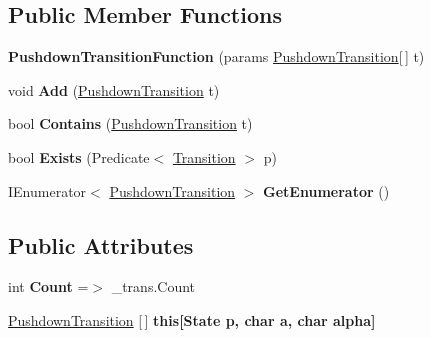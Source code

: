 \subsection*{Public Member Functions}
\begin{DoxyCompactItemize}
\item 
\mbox{\label{class_system_1_1_automata_1_1_pushdown_transition_function_a2f4c35d7442e155bf73aaa70c3bb203e}} 
{\bfseries Pushdown\+Transition\+Function} (params \mbox{\hyperlink{class_system_1_1_automata_1_1_pushdown_transition}{Pushdown\+Transition}}\mbox{[}$\,$\mbox{]} t)
\item 
\mbox{\label{class_system_1_1_automata_1_1_pushdown_transition_function_a2f391f47af647521368f76797263e999}} 
void {\bfseries Add} (\mbox{\hyperlink{class_system_1_1_automata_1_1_pushdown_transition}{Pushdown\+Transition}} t)
\item 
\mbox{\label{class_system_1_1_automata_1_1_pushdown_transition_function_a4e7f49843ec7c016057b020f3cbc4efa}} 
bool {\bfseries Contains} (\mbox{\hyperlink{class_system_1_1_automata_1_1_pushdown_transition}{Pushdown\+Transition}} t)
\item 
\mbox{\label{class_system_1_1_automata_1_1_pushdown_transition_function_ac1d0852a760decb8af403e01c00645d6}} 
bool {\bfseries Exists} (Predicate$<$ \mbox{\hyperlink{class_system_1_1_automata_1_1_transition}{Transition}} $>$ p)
\item 
\mbox{\label{class_system_1_1_automata_1_1_pushdown_transition_function_a517ca0177583fc9438b1b688d26ddacb}} 
I\+Enumerator$<$ \mbox{\hyperlink{class_system_1_1_automata_1_1_pushdown_transition}{Pushdown\+Transition}} $>$ {\bfseries Get\+Enumerator} ()
\end{DoxyCompactItemize}
\subsection*{Public Attributes}
\begin{DoxyCompactItemize}
\item 
\mbox{\label{class_system_1_1_automata_1_1_pushdown_transition_function_ad889b934b944ce5d2f36afc16a1e28a2}} 
int {\bfseries Count} =$>$ \+\_\+trans.\+Count
\item 
\mbox{\hyperlink{class_system_1_1_automata_1_1_pushdown_transition}{Pushdown\+Transition}} \mbox{[}$\,$\mbox{]} {\bfseries this\mbox{[}\+State p, char a, char alpha\mbox{]}}
\end{DoxyCompactItemize}


